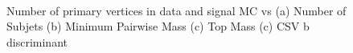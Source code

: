 \begin{figure}[Htcb]
\begin{center}
\\
\caption{
Number of primary vertices in data and signal MC vs
(a) Number of Subjets  
(b) Minimum Pairwise Mass
(c) Top Mass
(c) CSV b discriminant 
}
\label{figs:PUplots}
\end{center}
\end{figure}


